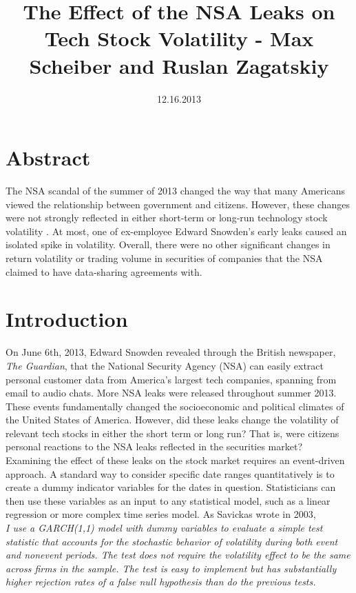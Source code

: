 \documentclass[11pt]{amsart}
\title{The Effect of the NSA Leaks on Tech Stock Volatility - Max Scheiber and Ruslan Zagatskiy}
\date{12.16.2013}
\begin{document}
\maketitle
\section{Abstract}
The NSA scandal of the summer of 2013 changed the way that many Americans viewed the relationship between government and citizens. However, these changes were not strongly reflected in either short-term or long-run technology stock volatility . At most, one of ex-employee Edward Snowden's early leaks caused an isolated spike in volatility. Overall, there were no other significant changes in return volatility or trading volume in securities of companies that the NSA claimed to have data-sharing agreements with. \\

\section{Introduction}
On June 6th, 2013, Edward Snowden revealed through the British newspaper, \textit{The Guardian}, that the National Security Agency (NSA) can easily extract personal customer data from America's largest tech companies, spanning from email to audio chats. More NSA leaks were released throughout summer 2013. These events fundamentally changed the socioeconomic and political climates of the United States of America. However, did these leaks change the volatility of relevant tech stocks in either the short term or long run? That is, were citizens personal reactions to the NSA leaks reflected in the securities market? \\

Examining the effect of these leaks on the stock market requires an event-driven approach. A standard way to consider specific date ranges quantitatively is to create a dummy indicator variables for the dates in question. Statisticians can then use these variables as an input to any statistical model, such as a linear regression or more complex time series model. As Savickas wrote in 2003, \\

\textit{I use a GARCH(1,1) model with dummy variables to evaluate a simple test statistic that accounts for the stochastic behavior of volatility during both event and nonevent periods. The test does not require the volatility effect to be the same across firms in the sample. The test is easy to implement but has substantially higher rejection rates of a false null hypothesis than do the previous tests.} \\
\end{document}
